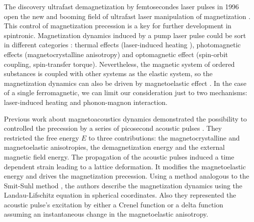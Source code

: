\documentclass[%
superscriptaddress,
preprint,
showpacs,
amsmath,
amssymb,
aps,
prl,
]{revtex4-1}
\begin{document}
The discovery ultrafast demagnetization by femtosecondes laser pulses in 1996 \cite{beaurepaire1996ultrafast} open the new and booming field of ultrafast
laser manipulation of magnetization \cite{koopmans2000ultrafast,van2002all,guidoni2002magneto,zhang2002coherent,vomir2005real,bigot2005ultrafast,kimel2005ultrafast,malinowski2008control,bigot2009coherent,bovensiepen2009femtomagnetism,radu2009laser,carpene2010ultrafast,boeglin2010distinguishing,radu2011transient,rudolf2012ultrafast,bombeck2013magnetization,kim2012ultrafast,kim2015controlling,kim2017magnetization}.
This control of magnetization precession is a key for further development in spintronic.
Magnetization dynamics induced by a pump laser pulse could be sort in different categories \cite{kirilyuk2010ultrafast}: thermal effects (laser-induced heating \cite{van2002all,carpene2010ultrafast}), photomagnetic effects (magnetocrystalline anisotropy) and optomagnetic effect (spin-orbit coupling, spin-transfer torque\cite{nvemec2012experimental,razdolski2017nanoscale,alekhin2017femtosecond}).
Nevertheless, the magnetic system of ordered substances is coupled with other systems as the elastic system, so the magnetization dynamics can also be driven by magnetoelastic effect \cite{beaurepaire1996ultrafast,kim2012ultrafast,bombeck2012excitation,temnov2012ultrafast,bombeck2013magnetization,kim2015controlling,januvsonis2016ultrafast,kim2017magnetization,chang2017parametric}.
In the case of a single ferromagnetic, we can limit our consideration just to two mechanisms: laser-induced heating and phonon-magnon interaction.

Previous work about magnetoacoustics dynamics demonstrated the possibility to controlled the precession by a series of picosecond acoustic pulses \cite{kim2012ultrafast,kim2015controlling,kim2017magnetization}.
They restricted the free energy $E$ to three contributions: the magnetocrystalline and magnetoelastic anisotropies, the demagnetization energy and the external magnetic field energy.
The propagation of the acoustic pulses induced a time dependent strain leading to a lattice deformation. %
It modifies the magnetoelastic energy and drives the magnetization precession.
Using a method analogous to the Smit-Suhl method \cite{smit1955ferromagnetic,suhl1955ferromagnetic}, the authors describe the magnetization dynamics using the Landau-Lifschitz equation in spherical coordinates. 
Also they represented the acoustic pulse's excitation by either a Crenel function or a delta function assuming an instantaneous change in the magnetoelastic anisotropy.
\end{document}
